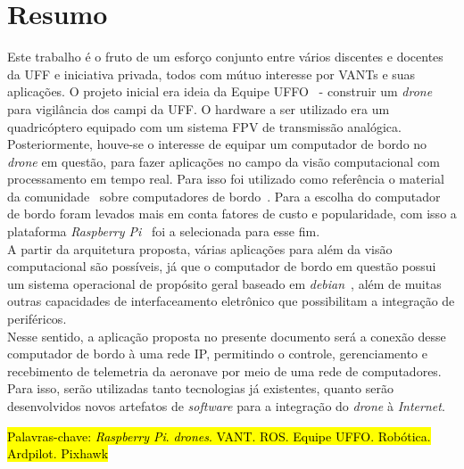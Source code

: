 \documentclass[12pt,a4paper,oneside]{book}
\begin{document}
\pagebreak




\chapter*{Resumo}
%
%
\thispagestyle{myheadings}
%
Este trabalho é o fruto de um esforço conjunto entre vários discentes e docentes da UFF e iniciativa privada, todos com mútuo 
interesse por VANTs e suas aplicações. O projeto inicial era ideia da Equipe UFFO~\cite{url:equipeuffo} - construir um \textit{drone} 
para vigilância dos campi da UFF. O hardware a ser utilizado era um quadricóptero equipado com um sistema FPV de transmissão analógica. 
Posteriormente, houve-se o interesse de equipar um computador de bordo no \textit{drone} em questão, para fazer aplicações no campo 
da visão computacional com processamento em tempo real. Para isso foi utilizado como referência o material da comunidade~\cite{url:ardupilotdoc} 
sobre computadores de bordo~\cite{url:ardupilot-companioncomputers}. Para a escolha do computador de bordo foram levados mais em conta fatores de custo e popularidade, com isso a plataforma \textit{Raspberry Pi}~\cite{url:raspberrypi} foi a selecionada para esse fim.\\
%
A partir da arquitetura proposta, várias aplicações para além da visão computacional são possíveis, já que o computador de bordo em questão 
possui um sistema operacional de propósito geral baseado em \textit{debian}~\cite{url:debian}, além de muitas outras capacidades de interfaceamento eletrônico que possibilitam a integração de periféricos.\\
%
Nesse sentido, a aplicação proposta no presente documento será a conexão desse computador de bordo à uma rede IP, permitindo o controle, gerenciamento e recebimento de telemetria da aeronave por meio de uma rede de computadores. Para isso, serão utilizadas tanto tecnologias já existentes, quanto serão desenvolvidos novos artefatos de \textit{software} para a integração do \textit{drone} à \textit{Internet}.
%

\bigskip

\hl{ Palavras-chave: \textit{Raspberry Pi}. \textit{drones}. VANT. ROS. Equipe UFFO. Robótica. Ardpilot. Pixhawk}
\end{document}

